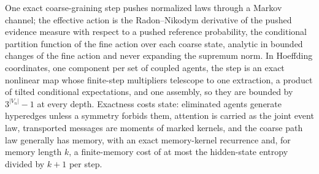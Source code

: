 One exact coarse-graining step pushes normalized laws through a Markov channel; the
effective action is the Radon--Nikodym derivative of the pushed evidence measure
with respect to a pushed reference probability, the conditional partition function
of the fine action over each coarse state, analytic in bounded changes of the fine
action and never expanding the supremum norm. In Hoeffding coordinates, one
component per set of coupled agents, the step is an exact nonlinear map whose
finite-step multipliers telescope to one extraction, a product of tilted
conditional expectations, and one assembly, so they are bounded by
$3^{\lvert V_n\rvert}-1$ at every depth. Exactness costs state: eliminated agents
generate hyperedges unless a symmetry forbids them, attention is carried as the
joint event law, transported messages are moments of marked kernels, and the coarse
path law generally has memory, with an exact memory-kernel recurrence and, for
memory length $k$, a finite-memory cost of at most the hidden-state entropy divided
by $k+1$ per step.
